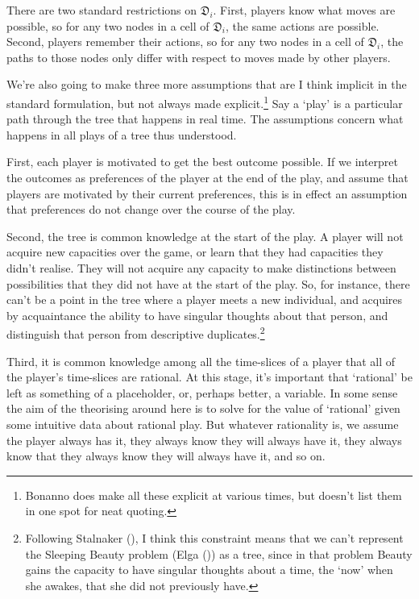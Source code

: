 \documentclass[
  12pt,
  letterpaper,
  DIV=11,
  numbers=noendperiod]{scrreprt}
\begin{document}
There are two standard restrictions on \(\mathfrak{D}_i\). First,
players know what moves are possible, so for any two nodes in a cell of
\(\mathfrak{D}_i\), the same actions are possible. Second, players
remember their actions, so for any two nodes in a cell of
\(\mathfrak{D}_i\), the paths to those nodes only differ with respect to
moves made by other players.

We're also going to make three more assumptions that are I think
implicit in the standard formulation, but not always made
explicit.\footnote{Bonanno does make all these explicit at various
  times, but doesn't list them in one spot for neat quoting.} Say a
`play' is a particular path through the tree that happens in real time.
The assumptions concern what happens in all plays of a tree thus
understood.

First, each player is motivated to get the best outcome possible. If we
interpret the outcomes as preferences of the player at the end of the
play, and assume that players are motivated by their current
preferences, this is in effect an assumption that preferences do not
change over the course of the play.

Second, the tree is common knowledge at the start of the play. A player
will not acquire new capacities over the game, or learn that they had
capacities they didn't realise. They will not acquire any capacity to
make distinctions between possibilities that they did not have at the
start of the play. So, for instance, there can't be a point in the tree
where a player meets a new individual, and acquires by acquaintance the
ability to have singular thoughts about that person, and distinguish
that person from descriptive duplicates.\footnote{Following Stalnaker
  (), I think this constraint means
  that we can't represent the Sleeping Beauty problem (Elga
  ()) as a tree, since in that problem
  Beauty gains the capacity to have singular thoughts about a time, the
  `now' when she awakes, that she did not previously have.}

Third, it is common knowledge among all the time-slices of a player that
all of the player's time-slices are rational. At this stage, it's
important that `rational' be left as something of a placeholder, or,
perhaps better, a variable. In some sense the aim of the theorising
around here is to solve for the value of `rational' given some intuitive
data about rational play. But whatever rationality is, we assume the
player always has it, they always know they will always have it, they
always know that they always know they will always have it, and so on.
\end{document}
